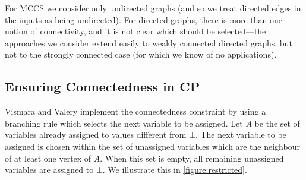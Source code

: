 \documentclass{llncs}
\begin{document}
For MCCS we consider only undirected graphs (and so we treat directed edges in the inputs as being
undirected). For directed graphs, there is more than one notion of connectivity, and it is not clear
which should be selected---the approaches we consider extend easily to weakly connected directed
graphs, but not to the strongly connected case (for which we know of no applications).

\subsection{Ensuring Connectedness in CP}\label{mccs-cp}

Vismara and Valery \cite{DBLP:conf/mco/VismaraV08} implement the connectedness constraint by using a
branching rule which selects the next variable to be assigned. Let $A$ be the
set of variables already assigned to values different from $\bot$. The next variable to be assigned
is chosen within the set of unassigned variables which are the neighbour of at least one vertex of
$A$.  When this set is empty, all remaining unassigned variables are assigned to
$\bot$. We illustrate this in \cref{figure:restricted}.
\end{document}
